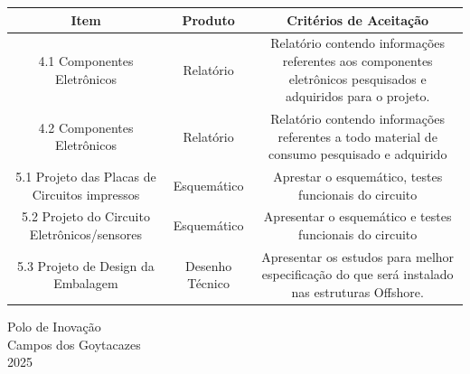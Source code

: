 \begin{center}
    \begin{center}
    \small
    \begin{tabular}{|c|c|c|}
    \hline
        Item & Produto & Critérios de Aceitação \\
    \hline
        \multicolumn{1}{|m{5cm}|}{
            4.1 Componentes Eletrônicos
        } 
        & \multicolumn{1}{m{3.5cm}|}{
            \centering
            Relatório
        } 
        & \multicolumn{1}{m{6.5cm}|}{
            Relatório contendo informações referentes aos componentes eletrônicos pesquisados e adquiridos para o projeto.
        }\\
    \hline
        \multicolumn{1}{|m{5cm}|}{
            4.2 Componentes Eletrônicos
        } 
        & \multicolumn{1}{m{3.5cm}|}{
            \centering
            Relatório
        } 
        & \multicolumn{1}{m{6.5cm}|}{
            Relatório contendo
            informações referentes a
            todo material de consumo
            pesquisado e adquirido
        }\\
    \hline
        \multicolumn{1}{|m{5cm}|}{
            5.1 Projeto das Placas de Circuitos impressos
        } 
        & \multicolumn{1}{m{3.5cm}|}{
            \centering
            Esquemático
        } 
        & \multicolumn{1}{m{6.5cm}|}{
            Aprestar o esquemático,
            testes funcionais do circuito
        }\\
    \hline
        \multicolumn{1}{|m{5cm}|}{
            5.2 Projeto do Circuito Eletrônicos/sensores
        } 
        & \multicolumn{1}{m{3.5cm}|}{
            \centering
            Esquemático
        } 
        & \multicolumn{1}{m{6.5cm}|}{
            Apresentar o esquemático e
            testes funcionais do circuito
        }\\
    \hline
        \multicolumn{1}{|m{5cm}|}{
            5.3 Projeto de Design da Embalagem
        } 
        & \multicolumn{1}{m{3.5cm}|}{
            \centering
            Desenho Técnico
        } 
        & \multicolumn{1}{m{6.5cm}|}{
            Apresentar os estudos para
            melhor
            especificação do que será
            instalado nas estruturas
            Offshore.
        }\\
    \hline
    \end{tabular}
\end{center}

    \vfill
    \centering
    Polo de Inovação\\
    Campos dos Goytacazes\\
    2025


\end{center}
